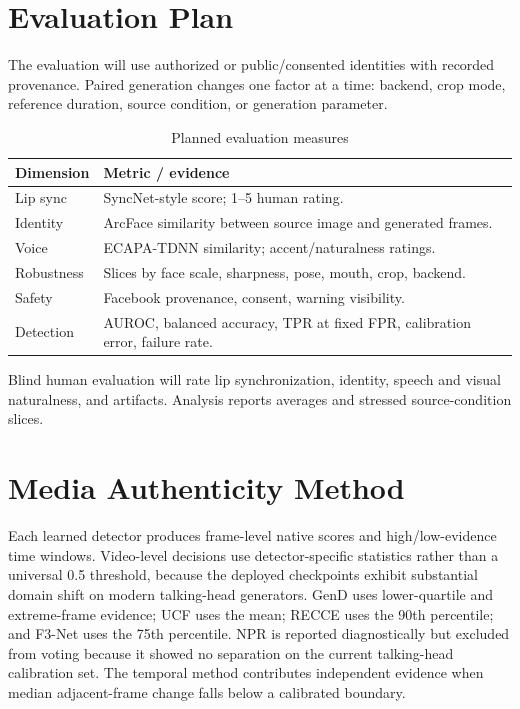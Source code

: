 \documentclass[10pt,conference]{IEEEtran}
\begin{document}
\section{Evaluation Plan}
The evaluation will use authorized or public/consented identities with recorded provenance. Paired generation changes one factor at a time: backend, crop mode, reference duration, source condition, or generation parameter.

\begin{table}[H]
\caption{Planned evaluation measures}
\label{tab:evaluation}
\centering
\scriptsize
\begin{tabular}{|p{}|p{}|}
\hline
\textbf{Dimension} & \textbf{Metric / evidence} \\
\hline
Lip sync & SyncNet-style score; 1--5 human rating. \\
\hline
Identity & ArcFace similarity between source image and generated frames. \\
\hline
Voice & ECAPA-TDNN similarity; accent/naturalness ratings. \\
\hline
Robustness & Slices by face scale, sharpness, pose, mouth, crop, backend. \\
\hline
Safety & Facebook provenance, consent, warning visibility. \\
\hline
Detection & AUROC, balanced accuracy, TPR at fixed FPR, calibration error, failure rate. \\
\hline
\end{tabular}
\end{table}

Blind human evaluation will rate lip synchronization, identity, speech and visual naturalness, and artifacts. Analysis reports averages and stressed source-condition slices.

\section{Media Authenticity Method}
Each learned detector produces frame-level native scores and high/low-evidence time windows. Video-level decisions use detector-specific statistics rather than a universal 0.5 threshold, because the deployed checkpoints exhibit substantial domain shift on modern talking-head generators. GenD uses lower-quartile and extreme-frame evidence; UCF uses the mean; RECCE uses the 90th percentile; and F3-Net uses the 75th percentile. NPR is reported diagnostically but excluded from voting because it showed no separation on the current talking-head calibration set. The temporal method contributes independent evidence when median adjacent-frame change falls below a calibrated boundary.
\end{document}
